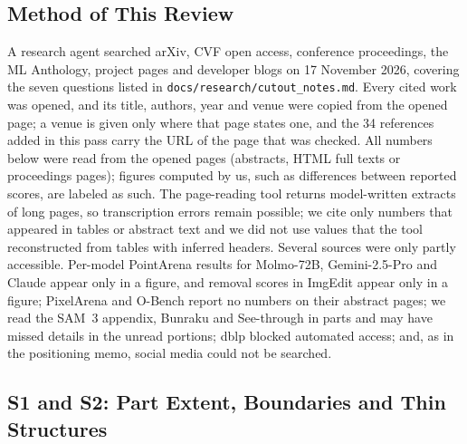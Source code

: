 \subsection{Method of This Review}
\label{sec:cutout-method}

A research agent searched arXiv, CVF open access, conference proceedings, the ML Anthology, project pages and developer blogs on 17 November 2026, covering the seven questions listed in \texttt{docs/research/cutout\_notes.md}. Every cited work was opened, and its title, authors, year and venue were copied from the opened page; a venue is given only where that page states one, and the 34 references added in this pass carry the URL of the page that was checked. All numbers below were read from the opened pages (abstracts, HTML full texts or proceedings pages); figures computed by us, such as differences between reported scores, are labeled as such. The page-reading tool returns model-written extracts of long pages, so transcription errors remain possible; we cite only numbers that appeared in tables or abstract text and we did not use values that the tool reconstructed from tables with inferred headers. Several sources were only partly accessible. Per-model PointArena results for Molmo-72B, Gemini-2.5-Pro and Claude appear only in a figure, and removal scores in ImgEdit appear only in a figure; PixelArena and O-Bench report no numbers on their abstract pages; we read the SAM~3 appendix, Bunraku and See-through in parts and may have missed details in the unread portions; dblp blocked automated access; and, as in the positioning memo, social media could not be searched.

\subsection{S1 and S2: Part Extent, Boundaries and Thin Structures}
\label{sec:cutout-seg}

